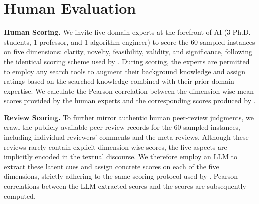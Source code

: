 \section{Human Evaluation}
\label{app:human}
\textbf{Human Scoring.}
We invite five domain experts at the forefront of AI (3 Ph.D. students, 1 professor, and 1 algorithm engineer) to score the 60 sampled instances on five dimensions: clarity, novelty, feasibility, validity, and significance, following the identical scoring scheme used by {\ours}.
During scoring, the experts are permitted to employ any search tools to augment their background knowledge and assign ratings based on the searched knowledge combined with their prior domain expertise.
We calculate the Pearson correlation between the dimension-wise mean scores provided by the human experts and the corresponding scores produced by {\ours}.

\textbf{Review Scoring.}
To further mirror authentic human peer-review judgments, we crawl the publicly available peer-review records for the 60 sampled instances, including individual reviewers' comments and the meta-reviews.
Although these reviews rarely contain explicit dimension-wise scores, the five aspects are implicitly encoded in the textual discourse.
We therefore employ an LLM to extract these latent cues and assign concrete scores on each of the five dimensions, strictly adhering to the same scoring protocol used by {\ours}.
Pearson correlations between the LLM-extracted scores and the {\ours} scores are subsequently computed.